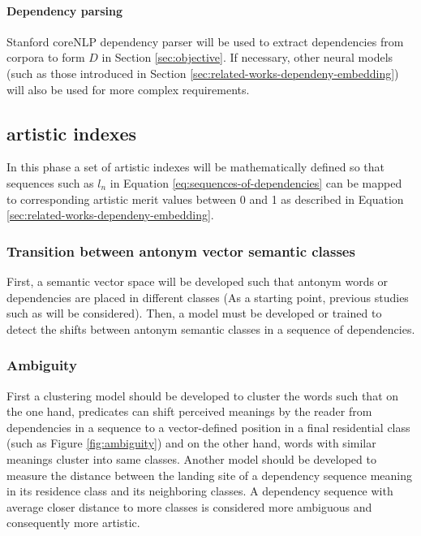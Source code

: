\documentclass{article}
\begin{document}
	\paragraph{Dependency parsing} Stanford coreNLP dependency parser will be used to extract dependencies from corpora to form $D$ in Section \ref{sec:objective}. If necessary, other neural models (such as those introduced in Section \ref{sec:related-works-dependeny-embedding}) will also be used for more complex requirements. 
	\subsection{artistic indexes} \label{sec:methodology-artistic-merit-indexes}
	In this phase a set of artistic indexes will be mathematically defined so that sequences such as $l_n$ in Equation \ref{eq:sequences-of-dependencies} can be mapped to corresponding artistic merit values between 0 and 1 as described in Equation \ref{sec:related-works-dependeny-embedding}.
	\subsubsection{Transition between antonym vector semantic classes}\label{sec:methodology-antonym-class-shifts}
	First, a semantic vector space will be developed such that antonym words or dependencies are placed in different classes (As a starting point, previous studies such as \citet{ono-2015-word-embedding-based-antonym-detection-using-thesauri-and-distributional-information} will be considered). Then, a model must be developed or trained %
	to detect the shifts between antonym semantic classes in a sequence of dependencies.    
	
	\subsubsection{Ambiguity} \label{sec:methodology-ambiguity-appeal}
	First a clustering model should be developed to cluster the words such that on the one hand, predicates can shift perceived meanings by the reader from dependencies in a sequence to  a vector-defined position in a final residential class (such as Figure \ref{fig:ambiguity}) and on the other hand, words with similar meanings cluster into same classes. Another model should be developed to measure the distance between the landing site of a dependency sequence meaning in its residence class and its neighboring classes. A dependency sequence with average closer distance to more classes is considered more ambiguous and consequently more artistic.  
	
\end{document}
